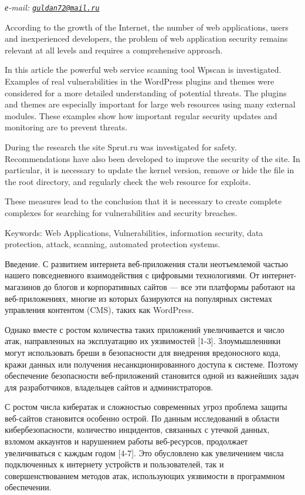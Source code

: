 \documentclass[
]{article}
\begin{document}
\emph{е-mail:
\href{mailto:guldan72@mail.ru}{\nolinkurl{guldan72@mail.ru}}}

According to the growth of the Internet, the number of web applications,
users and inexperienced developers, the problem of web application
security remains relevant at all levels and requires a comprehensive
approach.

In this article the powerful web service scanning tool Wpscan is
investigated. Examples of real vulnerabilities in the WordPress plugins
and themes were considered for a more detailed understanding of
potential threats. The plugins and themes are especially important for
large web resources using many external modules. These examples show how
important regular security updates and monitoring are to prevent
threats.

During the research the site Sprut.ru was investigated for safety.
Recommendations have also been developed to improve the security of the
site. In particular, it is necessary to update the kernel version,
remove or hide the file in the root directory, and regularly check the
web resource for exploits.

These measures lead to the conclusion that it is necessary to create
complete complexes for searching for vulnerabilities and security
breaches.

Keywords: Web Applications, Vulnerabilities, information security, data
protection, attack, scanning, automated protection systems.

Введение. С развитием интернета веб-приложения стали неотъемлемой частью
нашего повседневного взаимодействия с цифровыми технологиями. От
интернет-магазинов до блогов и корпоративных сайтов --- все эти
платформы работают на веб-приложениях, многие из которых базируются на
популярных системах управления контентом (CMS), таких как WordPress.

Однако вместе с ростом количества таких приложений увеличивается и число
атак, направленных на эксплуатацию их уязвимостей {[}1-3{]}.
Злоумышленники могут использовать бреши в безопасности для внедрения
вредоносного кода, кражи данных или получения несанкционированного
доступа к системе. Поэтому обеспечение безопасности веб-приложений
становится одной из важнейших задач для разработчиков, владельцев сайтов
и администраторов.

С ростом числа кибератак и сложностью современных угроз проблема защиты
веб-сайтов становится особенно острой. По данным исследований в области
кибербезопасности, количество инцидентов, связанных с утечкой данных,
взломом аккаунтов и нарушением работы веб-ресурсов, продолжает
увеличиваться с каждым годом {[}4-7{]}. Это обусловлено как увеличением
числа подключенных к интернету устройств и пользователей, так и
совершенствованием методов атак, использующих уязвимости в программном
обеспечении.
\end{document}
